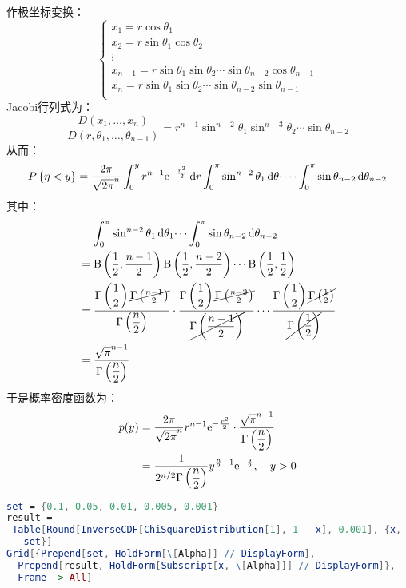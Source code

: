 作极坐标变换：
\[
    \begin{cases}
        x_{1} = r \cos \theta_{1} \\
        x_{2} = r \sin \theta_{1} \cos \theta_{2} \\
        \vdots\\
        x_{n-1} = r \sin \theta_{1} \sin \theta_{2} \cdots
        \sin\theta_{n-2} \cos\theta_{n-1}\\
        x_{n} = r \sin\theta_{1} \sin\theta_{2} \cdots
        \sin\theta_{n-2} \sin\theta_{n-1}\\
    \end{cases}
\]
Jacobi行列式为：
\[
    \frac{D(x_{1},\dots ,x_{n})}{D(r,\theta_{1},\dots,
    \theta_{n-1})} = r^{n-1} \sin^{n-2} \theta_{1}
    \sin^{n-3} \theta_{2} \cdots \sin\theta_{n-2}
\]
从而：
\[
    \P{\eta<y} = \frac{2\pi}{\sqrt{2\pi}^{n}}
    \int_{0}^{y} r^{n-1} \e^{-\frac{r^{2}}{2}} \d{r}
    \int_{0}^{\pi} \sin^{n-2} \theta_{1} \d{\theta_{1}} \dots
    \int_{0}^{\pi} \sin\theta_{n-2} \d{\theta_{n-2}}
\]
其中：
\begin{align*}
    &\placeholder{=}\int_{0}^{\pi} \sin^{n-2} \theta_{1}
    \d{\theta_{1}} \dots
    \int_{0}^{\pi} \sin\theta_{n-2} \d{\theta_{n-2}}\\
    &= \betafunc{\frac{1}{2}}{\frac{n-1}{2}}
    \betafunc{\frac{1}{2}}{\frac{n-2}{2}} \cdots
    \betafunc{\frac{1}{2}}{\frac{1}{2}}\\
    &=
    \frac{\gammfunc{\dfrac{1}{2}}
    \cancel{\gammfunc{\frac{n-1}{2}}}}{\gammfunc{\dfrac{n}{2}}} \cdot
    \frac{\gammfunc{\dfrac{1}{2}}
    \cancel{\gammfunc{\frac{n-2}{2}}}}{\cancel{\gammfunc{\dfrac{n-1}{2}}}}
    \cdots
    \frac{\gammfunc{\dfrac{1}{2}}
    \cancel{\gammfunc{\frac{1}{2}}}}{\cancel{\gammfunc{\dfrac{1}{2}}}}\\
    &= \frac{\sqrt{\pi}^{n-1} }{\gammfunc{\dfrac{n}{2}}}
\end{align*}
于是概率密度函数为：
\begin{align*}
    p(y) &= \frac{2\pi}{\sqrt{2\pi}^{n}} r^{n-1} \mathrm{e}^{-\frac{r^{2}}{2}}
    \cdot \frac{\sqrt{\pi}^{n-1} }{\Gamma\left(\dfrac{n}{2}\right)}\\
    &= \frac{1}{2^{n/2} \Gamma\left(\dfrac{n}{2}\right)}
    y^{\frac{n}{2}-1} \mathrm{e}^{-\frac{y}{2}}, \quad y>0
\end{align*}

\begin{lstlisting}[language=Mathematica]
set = {0.1, 0.05, 0.01, 0.005, 0.001}
result =
 Table[Round[InverseCDF[ChiSquareDistribution[1], 1 - x], 0.001], {x,
   set}]
Grid[{Prepend[set, HoldForm[\[Alpha]] // DisplayForm],
  Prepend[result, HoldForm[Subscript[x, \[Alpha]]] // DisplayForm]},
  Frame -> All]
\end{lstlisting}

